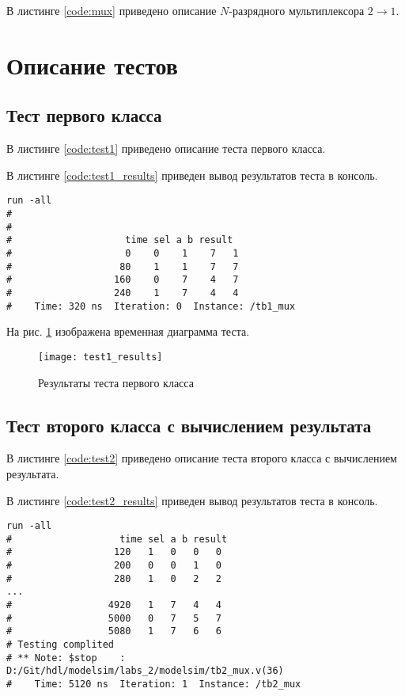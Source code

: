 В листинге \ref{code:mux} приведено описание $N$-разрядного мультиплексора $2 \rightarrow 1$.


\section{Описание тестов}
\label{sec:tests}

\subsection{Тест первого класса}

В листинге \ref{code:test1} приведено описание теста первого класса.


В листинге \ref{code:test1_results} приведен вывод результатов теста в консоль.
\begin{lstlisting}[caption=Результаты теста первого класса, label=code:test1_results, language={}]
run -all
# 
# 
# 		             time sel a b result
#                    0    0    1    7   1
#                   80    1    1    7   7
#                  160    0    7    4   7
#                  240    1    7    4   4
#    Time: 320 ns  Iteration: 0  Instance: /tb1_mux
\end{lstlisting}

На рис. \ref{fig:test1_results} изображена временная диаграмма теста.
\begin{figure}[H]
	\begin{center}
		\texttt{[image: test1\_results]}
		\caption{Результаты теста первого класса}
		\label{fig:test1_results}
	\end{center}
\end{figure}
\vspace{-1.5cm}

\subsection{Тест второго класса с вычислением результата}

В листинге \ref{code:test2} приведено описание теста второго класса с вычислением результата.


В листинге \ref{code:test2_results} приведен вывод результатов теста в консоль.
\begin{lstlisting}[caption=Результаты теста второго класса с вычислением результата, label=code:test2_results, language={}]
run -all
# 		            time sel a b result
#                  120   1   0   0   0
#                  200   0   0   1   0
#                  280   1   0   2   2
...
#                 4920   1   7   4   4
#                 5000   0   7   5   7
#                 5080   1   7   6   6
# Testing complited
# ** Note: $stop    : D:/Git/hdl/modelsim/labs_2/modelsim/tb2_mux.v(36)
#    Time: 5120 ns  Iteration: 1  Instance: /tb2_mux
\end{lstlisting}

